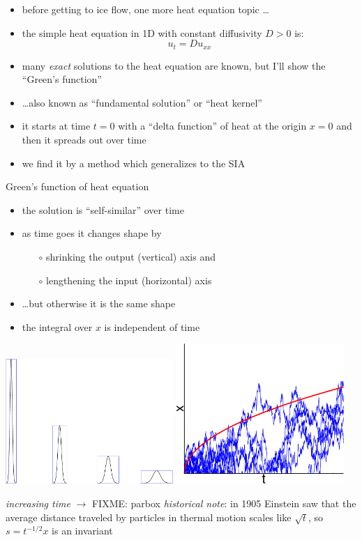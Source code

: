 \documentclass[titlepage,letterpaper,final,12pt]{scrartcl}
\begin{document}
\begin{itemize}
\item before getting to ice flow, one more heat equation topic \dots
\item the simple heat equation in 1D with constant diffusivity $D>0$ is:
	$$u_t = D u_{xx}$$
\item many \emph{exact} solutions to the heat equation are known, but I'll show the ``Green's function''
\item \dots also known as ``fundamental solution'' or ``heat kernel''
\item it starts at time $t=0$ with a ``delta function'' of heat at the origin $x=0$ and then it spreads out over time
\item we find it by a method which generalizes to the SIA
\end{itemize}

Green's function of heat equation

\begin{itemize}
\item the solution is ``self-similar'' over time
\item as time goes it changes shape by
  \begin{itemize}
  \item[$\circ$] shrinking the output (vertical) axis and
  \item[$\circ$] lengthening the input (horizontal) axis
  \end{itemize}
\item \dots but otherwise it is the same shape
\item the integral over $x$ is independent of time
\end{itemize}

\begin{center}
\includegraphics[width=2.5in]{heatscaling}
\quad
\includegraphics[width=2.5in]{brownian}

\emph{increasing time} $\to$ \qquad FIXME: parbox {\emph{historical note}:  in 1905 Einstein saw that the average distance traveled by particles in thermal motion scales like $\sqrt{t}$, so $s = t^{-1/2}x$ is an invariant}
\end{center}
\end{document}
